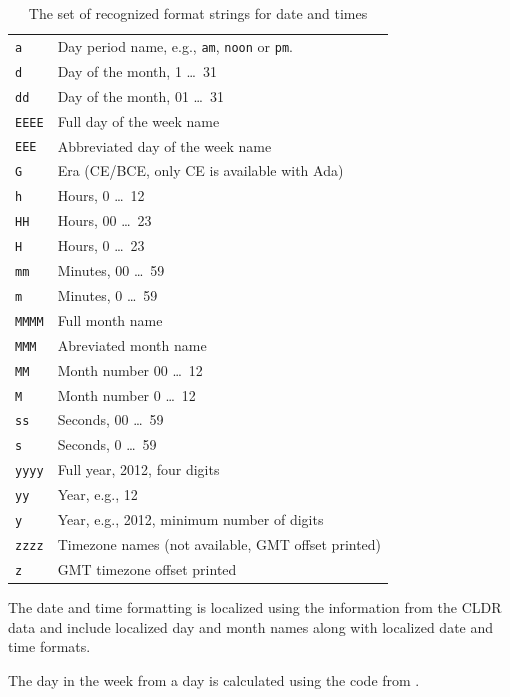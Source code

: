 \begin{table}
\begin{tabular}{ll}
\texttt{a} &  Day period name, e.g., \texttt{am}, \texttt{noon} or
              \texttt{pm}.\\
\texttt{d} &  Day of the month, 1 \ldots\ 31\\
\texttt{dd} &  Day of the month, 01 \ldots\ 31\\
\texttt{EEEE} &  Full day of the week name\\
\texttt{EEE} &  Abbreviated day of the week name\\
\texttt{G} &  Era (CE/BCE, only CE is available with Ada)\\
\texttt{h} &  Hours, 0 \ldots\ 12\\
\texttt{HH} &  Hours, 00 \ldots\ 23\\
\texttt{H} &  Hours, 0 \ldots\ 23\\
\texttt{mm} &  Minutes, 00 \ldots\ 59\\
\texttt{m} &  Minutes, 0 \ldots\ 59\\
\texttt{MMMM} &  Full month name\\
\texttt{MMM} &  Abreviated month name\\
\texttt{MM} &  Month number 00 \ldots\ 12\\
\texttt{M} &  Month number 0 \ldots\ 12\\
\texttt{ss} &  Seconds, 00 \ldots\ 59\\
\texttt{s} &  Seconds, 0 \ldots\ 59\\
\texttt{yyyy} &  Full year, 2012, four digits\\
\texttt{yy} &  Year, e.g., 12\\
\texttt{y} &  Year, e.g., 2012, minimum number of digits\\
\texttt{zzzz} &  Timezone names (not available, GMT offset printed)\\
\texttt{z} &  GMT timezone offset printed\\
\end{tabular}
\caption{The set of recognized format strings for date and times}
\label{tab:datetimeformats}
\end{table}

The date and time formatting is localized using the information from the
CLDR data and include localized day and month names along with localized
date and time formats.

The day in the week from a day is calculated using the code from
\cite{DayInWeek}.

